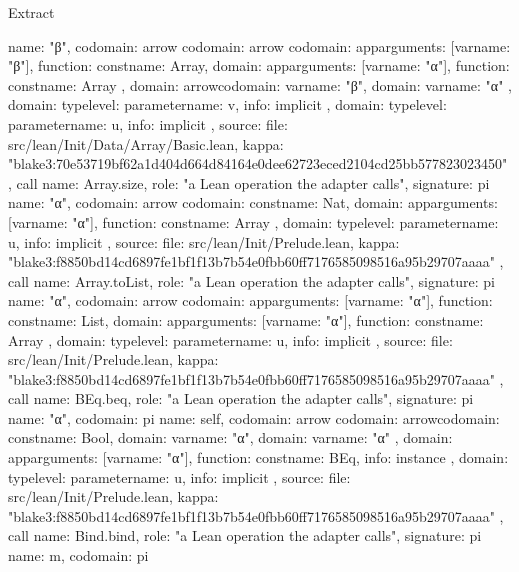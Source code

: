 \begin{lexlean}{Extract}
\begin{toolingmodule}
{{{{          name: "β",
          codomain: arrow{
            codomain: arrow{
              codomain: app{arguments: [var{name: "β"}], function: const{name: Array}},
              domain: app{arguments: [var{name: "α"}], function: const{name: Array}}
            },
            domain: arrow{codomain: var{name: "β"}, domain: var{name: "α"}}
          },
          domain: type{level: parameter{name: v}},
          info: implicit
        },
        domain: type{level: parameter{name: u}},
        info: implicit
      },
      source: {
        file: src/lean/Init/Data/Array/Basic.lean,
        kappa: "blake3:70e53719bf62a1d404d664d84164e0dee62723eced2104cd25bb577823023450"
      }
    },
    call{
      name: Array.size,
      role: "a Lean operation the adapter calls",
      signature: pi{
        name: "α",
        codomain: arrow{
          codomain: const{name: Nat},
          domain: app{arguments: [var{name: "α"}], function: const{name: Array}}
        },
        domain: type{level: parameter{name: u}},
        info: implicit
      },
      source: {
        file: src/lean/Init/Prelude.lean,
        kappa: "blake3:f8850bd14cd6897fe1bf1f13b7b54e0fbb60ff7176585098516a95b29707aaaa"
      }
    },
    call{
      name: Array.toList,
      role: "a Lean operation the adapter calls",
      signature: pi{
        name: "α",
        codomain: arrow{
          codomain: app{arguments: [var{name: "α"}], function: const{name: List}},
          domain: app{arguments: [var{name: "α"}], function: const{name: Array}}
        },
        domain: type{level: parameter{name: u}},
        info: implicit
      },
      source: {
        file: src/lean/Init/Prelude.lean,
        kappa: "blake3:f8850bd14cd6897fe1bf1f13b7b54e0fbb60ff7176585098516a95b29707aaaa"
      }
    },
    call{
      name: BEq.beq,
      role: "a Lean operation the adapter calls",
      signature: pi{
        name: "α",
        codomain: pi{
          name: self,
          codomain: arrow{
            codomain: arrow{codomain: const{name: Bool}, domain: var{name: "α"}},
            domain: var{name: "α"}
          },
          domain: app{arguments: [var{name: "α"}], function: const{name: BEq}},
          info: instance
        },
        domain: type{level: parameter{name: u}},
        info: implicit
      },
      source: {
        file: src/lean/Init/Prelude.lean,
        kappa: "blake3:f8850bd14cd6897fe1bf1f13b7b54e0fbb60ff7176585098516a95b29707aaaa"
      }
    },
    call{
      name: Bind.bind,
      role: "a Lean operation the adapter calls",
      signature: pi{
        name: m,
        codomain: pi{
}}}}
\end{toolingmodule}
\end{lexlean}
